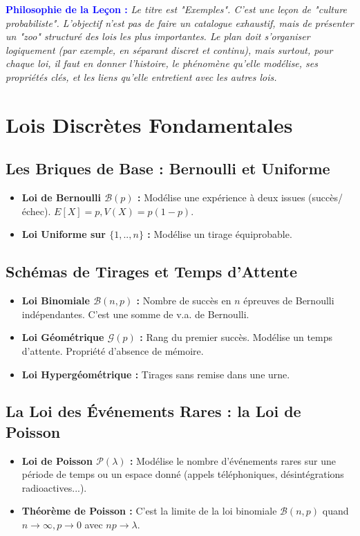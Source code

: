 \documentclass[12pt, a4paper, parskip=full]{report}
\theoremstyle{agregstyle}
\newenvironment{philosophie}
  {\par\medskip\noindent\begin{oframed}\noindent\textbf{\textcolor{blue}{Philosophie de la Leçon :}}\itshape}
  {\end{oframed}\par\medskip}
\begin{document}
\begin{philosophie}
    Le titre est "Exemples". C'est une leçon de "culture probabiliste". L'objectif n'est pas de faire un catalogue exhaustif, mais de présenter un "zoo" structuré des lois les plus importantes. Le plan doit s'organiser logiquement (par exemple, en séparant discret et continu), mais surtout, pour chaque loi, il faut en donner l'histoire, le phénomène qu'elle modélise, ses propriétés clés, et les liens qu'elle entretient avec les autres lois.
\end{philosophie}

\section{Lois Discrètes Fondamentales}
\subsection{Les Briques de Base : Bernoulli et Uniforme}
\begin{itemize}
    \item \textbf{Loi de Bernoulli $\mathcal{B}(p)$ :} Modélise une expérience à deux issues (succès/échec). $E[X]=p, V(X)=p(1-p)$.
    \item \textbf{Loi Uniforme sur $\{1,..,n\}$ :} Modélise un tirage équiprobable.
\end{itemize}
\subsection{Schémas de Tirages et Temps d'Attente}
\begin{itemize}
    \item \textbf{Loi Binomiale $\mathcal{B}(n,p)$ :} Nombre de succès en $n$ épreuves de Bernoulli indépendantes. C'est une somme de v.a. de Bernoulli.
    \item \textbf{Loi Géométrique $\mathcal{G}(p)$ :} Rang du premier succès. Modélise un temps d'attente. Propriété d'absence de mémoire.
    \item \textbf{Loi Hypergéométrique :} Tirages sans remise dans une urne.
\end{itemize}
\subsection{La Loi des Événements Rares : la Loi de Poisson}
\begin{itemize}
    \item \textbf{Loi de Poisson $\mathcal{P}(\lambda)$ :} Modélise le nombre d'événements rares sur une période de temps ou un espace donné (appels téléphoniques, désintégrations radioactives...).
    \item \textbf{Théorème de Poisson :} C'est la limite de la loi binomiale $\mathcal{B}(n,p)$ quand $n \to \infty, p \to 0$ avec $np \to \lambda$.
\end{itemize}
\end{document}
